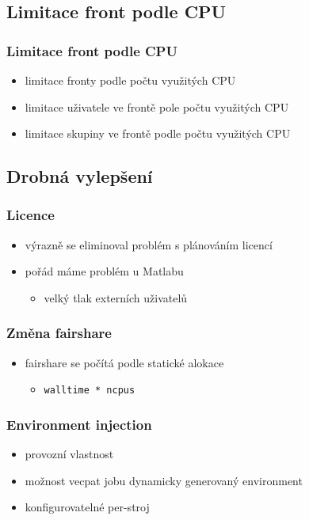 \documentclass[pdftex,aspectratio=169]{beamer}
\begin{document}
\subsection{Limitace front podle CPU}

\begin{frame}
	\frametitle{Limitace front podle CPU}
	\begin{itemize}
		\item{limitace fronty podle počtu využitých CPU}
		\item{limitace uživatele ve frontě pole počtu využitých CPU}
		\item{limitace skupiny ve frontě podle počtu využitých CPU}
	\end{itemize}
\end{frame}

\subsection{Drobná vylepšení}

\begin{frame}
	\frametitle{Licence}
	\begin{itemize}
		\item{výrazně se eliminoval problém s plánováním licencí}
		\item{pořád máme problém u Matlabu}
		\begin{itemize}
			\item{velký tlak externích uživatelů}
		\end{itemize}
	\end{itemize}
\end{frame}

\begin{frame}
	\frametitle{Změna fairshare}
	\begin{itemize}
		\item{fairshare se počítá podle statické alokace}
		\begin{itemize}
			\item{\texttt{walltime * ncpus}}
		\end{itemize}
	\end{itemize}
\end{frame}

\begin{frame}
	\frametitle{Environment injection}
	\begin{itemize}
		\item{provozní vlastnost}
		\item{možnost vecpat jobu dynamicky generovaný environment}
		\item{konfigurovatelné per-stroj}
	\end{itemize}
\end{frame}
\end{document}
